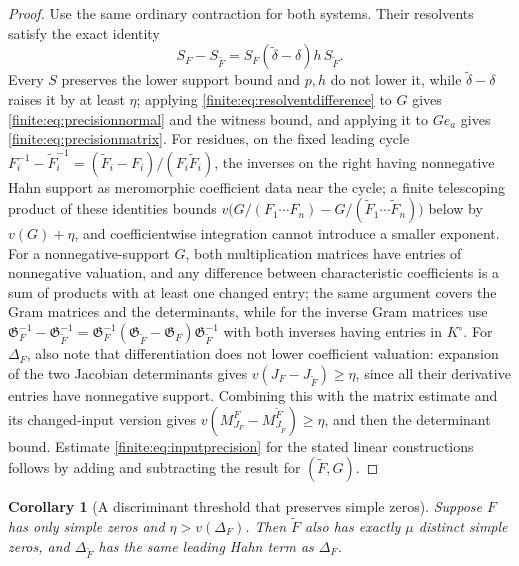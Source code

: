 \documentclass[11pt,letterpaper]{article}
\newtheorem{corollary}[theorem]{Corollary}
\theoremstyle{definition}
\theoremstyle{remark}
\newcommand{\Kc}{K^{\circ}}
\newcommand{\Gram}{\mathfrak G}
\numberwithin{equation}{section}
\begin{document}
\begin{proof}
Use the same ordinary contraction for both systems. Their resolvents satisfy the exact identity
\begin{equation}\label{finite:eq:resolventdifference}
 S_F-S_{\widetilde F}=S_F(\widetilde\delta-\delta)h\,S_{\widetilde F}.
\end{equation}
Every $S$ preserves the lower support bound and $p,h$ do not lower it, while $\widetilde\delta-\delta$ raises it by at least $\eta$; applying \eqref{finite:eq:resolventdifference} to $G$ gives \eqref{finite:eq:precisionnormal} and the witness bound, and applying it to $Ge_a$ gives \eqref{finite:eq:precisionmatrix}. For residues, on the fixed leading cycle $F_i^{-1}-\widetilde F_i^{-1}=(\widetilde F_i-F_i)/(F_i\widetilde F_i)$, the inverses on the right having nonnegative Hahn support as meromorphic coefficient data near the cycle; a finite telescoping product of these identities bounds $v\bigl(G/(F_1\cdots F_n)-G/(\widetilde F_1\cdots\widetilde F_n)\bigr)$ below by $v(G)+\eta$, and coefficientwise integration cannot introduce a smaller exponent. For a nonnegative-support $G$, both multiplication matrices have entries of nonnegative valuation, and any difference between characteristic coefficients is a sum of products with at least one changed entry; the same argument covers the Gram matrices and the determinants, while for the inverse Gram matrices use $\Gram_F^{-1}-\Gram_{\widetilde F}^{-1}=\Gram_F^{-1}(\Gram_{\widetilde F}-\Gram_F)\Gram_{\widetilde F}^{-1}$ with both inverses having entries in $\Kc$. For $\Delta_F$, also note that differentiation does not lower coefficient valuation: expansion of the two Jacobian determinants gives $v(J_F-J_{\widetilde F})\geq\eta$, since all their derivative entries have nonnegative support. Combining this with the matrix estimate and its changed-input version gives $v(M^F_{J_F}-M^{\widetilde F}_{J_{\widetilde F}})\geq\eta$, and then the determinant bound. Estimate \eqref{finite:eq:inputprecision} for the stated linear constructions follows by adding and subtracting the result for $(\widetilde F,G)$.
\end{proof}

\begin{corollary}[A discriminant threshold that preserves simple zeros]
\label{finite:cor:discstable}
Suppose $F$ has only simple zeros and $\eta>v(\Delta_F)$. Then $\widetilde F$ also has exactly $\mu$ distinct simple zeros, and $\Delta_{\widetilde F}$ has the \emph{same leading Hahn term} as $\Delta_F$.
\end{corollary}
\end{document}
